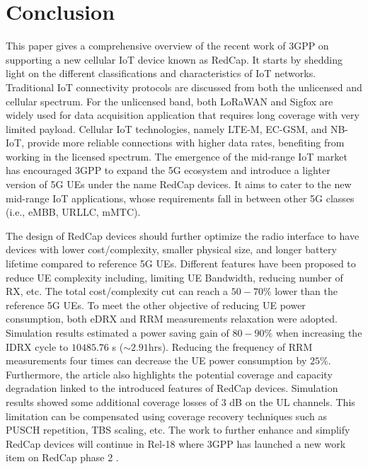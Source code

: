 \documentclass[]{IEEEtran}
\begin{document}


\section{Conclusion}
\label{sec:7-conclusion}
This paper gives a comprehensive overview of the recent work of 3GPP on supporting a new cellular IoT device known as RedCap.
It starts by shedding light on the different classifications and characteristics of IoT networks.
Traditional IoT connectivity protocols are discussed from both the unlicensed and cellular spectrum.
For the unlicensed band, both LoRaWAN and Sigfox are widely used for data acquisition application that requires long coverage with very limited payload.
Cellular IoT technologies, namely LTE-M, EC-GSM, and NB-IoT, provide more reliable connections with higher data rates, benefiting from working in the licensed spectrum.
The emergence of the mid-range IoT market has encouraged 3GPP to expand the 5G ecosystem and introduce a lighter version of 5G UEs under the name RedCap devices.
It aims to cater to the new mid-range IoT applications, whose requirements fall in between other 5G classes (i.e., eMBB, URLLC, mMTC).

The design of RedCap devices should further optimize the radio interface to have devices with lower cost/complexity, smaller physical size, and longer battery lifetime compared to reference 5G UEs.
Different features have been proposed to reduce UE complexity including, limiting UE Bandwidth, reducing number of RX, etc.
The total cost/complexity cut can reach a $50-70\%$ lower than the reference 5G UEs.
To meet the other objective of reducing UE power consumption, both eDRX and RRM measurements relaxation were adopted.
Simulation results estimated a power saving gain of $80-90\%$ when increasing the IDRX cycle to $10485.76$ s ($\sim 2.91$hrs).
Reducing the frequency of RRM measurements four times can decrease the UE power consumption by $25\%$.
Furthermore, the article also highlights the potential coverage and capacity degradation linked to the introduced features of RedCap devices.
Simulation results showed some additional coverage losses of $3$ dB on the UL channels.
This limitation can be compensated using coverage recovery techniques such as PUSCH repetition, TBS scaling, etc.
The work to further enhance and simplify RedCap devices will continue in Rel-18 where 3GPP has launched a new work item on RedCap phase 2
\cite{TR_38_875} \cite{R2-1912334}. 



\end{document}
